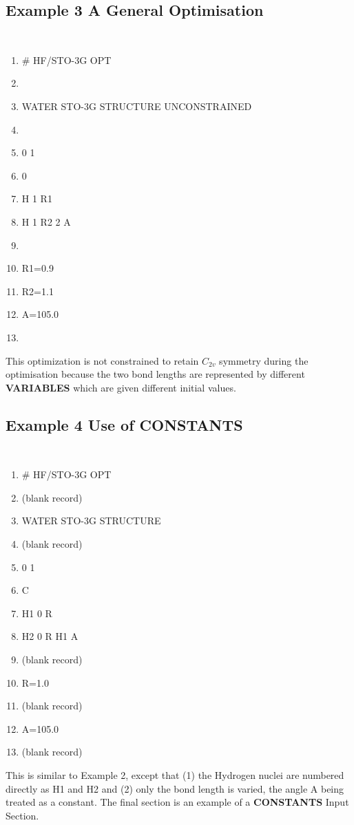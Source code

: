 \subsection{\sf Example 3 A General Optimisation}
{\tt 
\begin{enumerate}
\item   \# HF/STO-3G OPT
\item 
\item   WATER STO-3G STRUCTURE UNCONSTRAINED
\item 
\item   0 1
\item   0
\item   H 1 R1
\item   H 1 R2 2 A
\item 
\item   R1=0.9
\item   R2=1.1
\item   A=105.0
\item 
\end{enumerate}
}
This optimization is not constrained 
to retain $C_{2v}$ symmetry during the optimisation
because the two bond lengths are represented
by different {\bf VARIABLES} which are given different initial values.
\newpage
\subsection{\sf Example 4  Use of  CONSTANTS}
{\tt 
\begin{enumerate}
\item  \# HF/STO-3G OPT
\item (blank record)
\item  WATER STO-3G STRUCTURE
\item (blank record)
\item  0 1
\item  C
\item  H1 0 R
\item  H2 0 R H1 A
\item (blank record)
\item  R=1.0
\item (blank record)
\item  A=105.0
\item (blank record)
\end{enumerate}
}
This is similar to Example 2, except that (1) the Hydrogen nuclei are
numbered directly as H1 and H2 and (2) only the bond length is varied,
the angle A being treated as a constant.  The final section 
is an example of a {\bf CONSTANTS} Input Section.
\newpage
